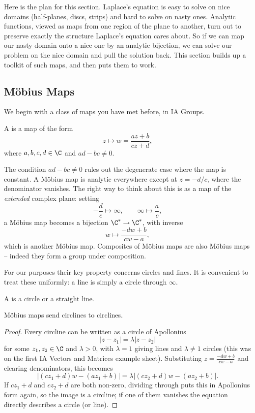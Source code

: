 Here is the plan for this section. Laplace's equation is easy to solve on nice domains (half-planes, discs, strips) and hard to solve on nasty ones. Analytic functions, viewed as maps from one region of the plane to another, turn out to preserve exactly the structure Laplace's equation cares about. So if we can map our nasty domain onto a nice one by an analytic bijection, we can solve our problem on the nice domain and pull the solution back. This section builds up a toolkit of such maps, and then puts them to work.

\subsection{M\"obius Maps}

We begin with a class of maps you have met before, in IA Groups.

\begin{definition}
	A  is a map of the form
	$$
	z \mapsto w = \frac{az + b}{cz + d},
	$$
	where $a, b, c, d \in \C$ and $ad - bc \neq 0$.
\end{definition}

The condition $ad - bc \neq 0$ rules out the degenerate case where the map is constant. A M\"obius map is analytic everywhere except at $z = -d/c$, where the denominator vanishes. The right way to think about this is as a map of the \emph{extended} complex plane: setting
$$
-\frac{d}{c} \mapsto \infty, \qquad \infty \mapsto \frac{a}{c},
$$
a M\"obius map becomes a bijection $\C^* \to \C^*$, with inverse
$$
w \mapsto \frac{-dw + b}{cw - a},
$$
which is another M\"obius map. Composites of M\"obius maps are also M\"obius maps -- indeed they form a group under composition.

For our purposes their key property concerns circles and lines. It is convenient to treat these uniformly: a line is simply a circle through $\infty$.

\begin{definition}[Circline]
	A  is a circle or a straight line.
\end{definition}

\begin{proposition}
	M\"obius maps send circlines to circlines.
\end{proposition}
\begin{proof}
	Every circline can be written as a circle of Apollonius
	$$
	|z - z_1| = \lambda|z - z_2|
	$$
	for some $z_1, z_2 \in \C$ and $\lambda > 0$, with $\lambda = 1$ giving lines and $\lambda \neq 1$ circles (this was on the first IA Vectors and Matrices example sheet). Substituting $z = \frac{-dw+b}{cw - a}$ and clearing denominators, this becomes
	$$
	|(cz_1 + d)w - (az_1 + b)| = \lambda |(cz_2 + d)w - (az_2 + b)|.
	$$
	If $cz_1 + d$ and $cz_2 + d$ are both non-zero, dividing through puts this in Apollonius form again, so the image is a circline; if one of them vanishes the equation directly describes a circle (or line).
\end{proof}

